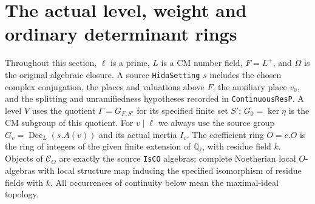 \section{The actual level, weight and ordinary determinant rings}
\label{sec:symplectic-universal-arithmetic}


Throughout this section, $\ell$ is a prime, $L$ is a CM number field,
$F=L^+$, and $\Omega$ is the original algebraic closure.
A source \texttt{HidaSetting} $s$ includes the chosen complex
conjugation, the places and valuations above $F$, the auxiliary place
$v_0$, and the splitting and unramifiedness hypotheses recorded in
\texttt{ContinuousResP}.  A level $V$ uses the quotient
$\Gamma=G_{F,S'}$ for its specified finite set $S'$;
$G_0=\ker\eta$ is the CM subgroup of this quotient.
For $v\mid\ell$ we always use the source group
$G_v=\operatorname{Dec}_{L}(s.A(v))$ and its actual inertia $I_v$.
The coefficient ring $O=c.O$ is the ring of integers of the given
finite extension of $\mathbb Q_\ell$, with residue field $k$.
Objects of $\mathcal C_O$ are exactly the source \texttt{IsCO}
algebras: complete Noetherian local $O$-algebras with local structure
map inducing the specified isomorphism of residue fields with $k$.
All occurrences of continuity below mean the maximal-ideal topology.

